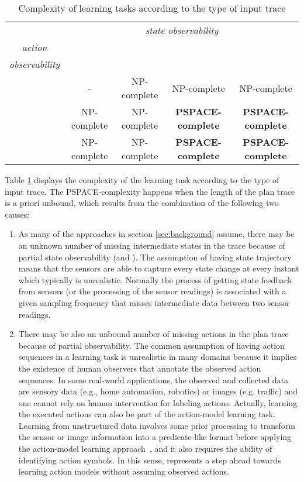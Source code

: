 

\begin{table}[ht]
\centering
\begin{tabular}{c|c|c|c|c|}
	& \multicolumn{4}{c|}{\emph{state observability}} \\ \cline{2-5}
	\multirow{1}{*}{\emph{action}} & \FO & \POstar & \PO & \NO\\ {\emph{observability}} & & & & \\ \hline
	\FO & - & NP-complete & NP-complete & NP-complete \\ \hline
	\PO & NP-complete & NP-complete & \textbf{PSPACE-complete} & \textbf{PSPACE-complete} \\ \hline
	\NO & NP-complete & NP-complete & \textbf{PSPACE-complete} & \textbf{PSPACE-complete} \\ \hline
\end{tabular}
\caption{Complexity of learning tasks according to the type of input trace}
\label{tab:complex}
\end{table}


Table \ref{tab:complex} displays the complexity of the learning task according to the type of input trace. The PSPACE-complexity happens when the length of the plan trace is a priori unbound, which results from the combination of the following two causes:

\begin{enumerate}
\item As many of the approaches in section \ref{sec:background} assume, there may be an unknown number of missing intermediate states in the trace because of partial state observability (\PO and \NO). The assumption of having \FO state trajectory means that the sensors are able to capture every state change at every instant which typically is unrealistic. Normally the process of getting state feedback from sensors (or the processing of the sensor readings) is associated with a given sampling frequency that misses intermediate data between two sensor readings.

\item There may be also an unbound number of missing actions in the plan trace because of partial observability. The common assumption of having \FO action sequences in a learning task is unrealistic in many domains because it implies the existence of human observers that annotate the observed action sequences. In some real-world applications, the observed and collected data are sensory data (e.g., home automation, robotics) or images (e.g. traffic) and one cannot rely on human intervention for labeling actions. Actually, learning the executed actions can also be part of the action-model learning task. Learning from unstructured data involves some prior processing to transform the sensor or image information into a predicate-like format before applying the action-model learning approach~\cite{AsaiF18}, and it also requires the ability of identifying action symbols. In this sense, \FAMA represents a step ahead towards learning action models without assuming observed actions.
\end{enumerate}


